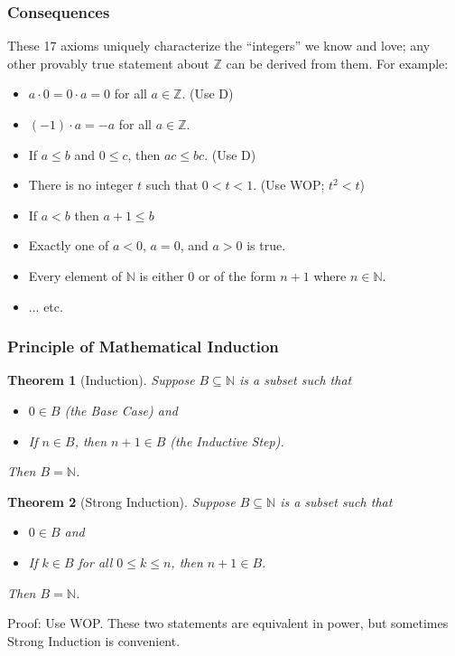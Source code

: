\documentclass{beamer}
\newtheorem{thm}{Theorem}
\begin{document}
\begin{frame}
\frametitle{Consequences}

These 17 axioms uniquely characterize the ``integers'' we know and love; any other provably true statement about $\mathbb{Z}$ can be derived from them. For example: \pause

\begin{itemize}
\item $a \cdot 0 = 0 \cdot a = 0$ for all $a \in \mathbb{Z}$. \pause (Use D) \pause
\item $(-1) \cdot a = -a$ for all $a \in \mathbb{Z}$. \pause
\item If $a \leq b$ and $0 \leq c$, then $ac \leq bc$. \pause (Use D) \pause
\item There is no integer $t$ such that $0 < t < 1$. \pause (Use WOP; $t^2 < t$) \pause
\item If $a < b$ then $a+1 \leq b$ \pause
\item Exactly one of $a < 0$, $a = 0$, and $a > 0$ is true. \pause
\item Every element of $\mathbb{N}$ is either 0 or of the form $n+1$ where $n \in \mathbb{N}$. \pause
\item ... etc.
\end{itemize}
\end{frame}



\begin{frame}
\frametitle{Principle of Mathematical Induction}

\begin{thm}[Induction]
Suppose $B \subseteq \mathbb{N}$ is a subset such that
\begin{itemize}
\item $0 \in B$ (the \emph{Base Case}) and
\item If $n \in B$, then $n + 1 \in B$ (the \emph{Inductive Step}).
\end{itemize}
Then $B = \mathbb{N}$.
\end{thm}

\begin{thm}[Strong Induction]
Suppose $B \subseteq \mathbb{N}$ is a subset such that
\begin{itemize}
\item $0 \in B$ and
\item If $k \in B$ for all $0 \leq k \leq n$, then $n+1 \in B$.
\end{itemize}
Then $B = \mathbb{N}$.
\end{thm}

Proof: Use WOP. These two statements are equivalent in power, but sometimes Strong Induction is convenient.
\end{frame}
\end{document}
